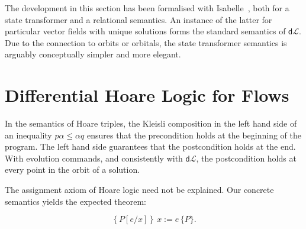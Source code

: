 \documentclass[envcountsame,envcountsect]{llncs}
\newcommand{\dL}{\mathsf{d}\mathcal{L}}
\newcommand{\Pow}{\mathcal{P}}
\newcommand{\reals}{\mathbb{R}}
\newcommand{\seq}{\mathop{\,;\,}}
\begin{document}

The development in this section has been formalised with
Isabelle~\cite{afp:hybrid}, both for a state transformer and a
relational semantics. An instance of the latter for particular vector
fields with unique solutions forms the standard semantics of
$\dL$. Due to the connection to orbits or orbitals, the state
transformer semantics is arguably conceptually simpler and more
elegant.



\section{Differential Hoare Logic for Flows}\label{sec:hoare-flow}

In the semantics of Hoare triples, the Kleisli composition in the left
hand side of an inequality $p\alpha\le \alpha q$ ensures that the
precondition holds at the beginning of the program. The left hand side
guarantees that the postcondition holds at the end. With evolution
commands, and consistently with $\dL$, the postcondition holds at
every point in the orbit of a solution.

The assignment axiom of Hoare logic need not be explained. Our concrete
semantics yields the expected theorem:

\begin{equation}
\left\{P[e/x]\right\}\,  x:=e\, \{P\}. \label{eq:h-assgn}\tag{h-assgn}
\end{equation}

\end{document}
